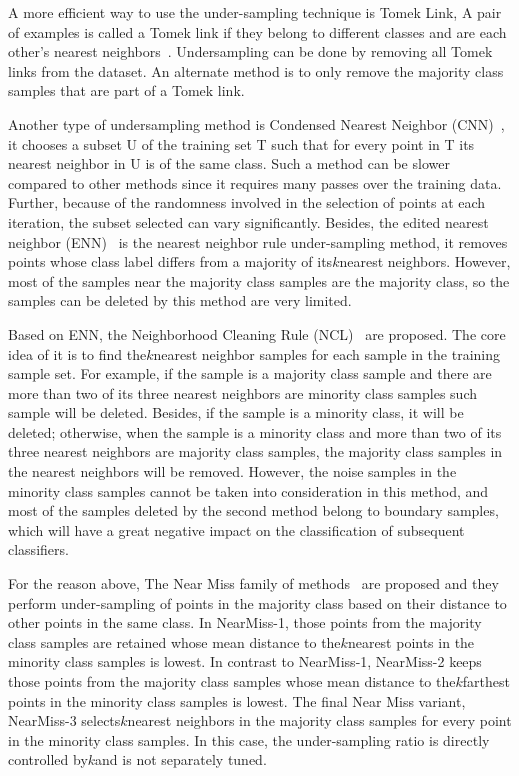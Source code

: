 A more efficient way to use the under-sampling technique is Tomek Link, A pair of examples is called a Tomek link if they belong to diﬀerent classes and are each other’s nearest neighbors~\cite{ref_16}. Undersampling can be done by removing all Tomek links from the dataset. An alternate method is to only remove the majority class samples that are part of a Tomek link.

Another type of undersampling method is Condensed Nearest Neighbor (CNN)~\cite{ref_6}, it chooses a subset U of the training set T such that for every point in T its nearest neighbor in U is of the same class. Such a method can be slower compared to other methods since it requires many passes over the training data. Further, because of the randomness involved in the selection of points at each iteration, the subset selected can vary signiﬁcantly. Besides, the edited nearest neighbor (ENN)~\cite{ref_17} is the nearest neighbor rule under-sampling method, it removes points whose class label differs from a majority of its$k$nearest neighbors. However, most of the samples near the majority class samples are the majority class, so the samples can be deleted by this method are very limited.

Based on ENN, the Neighborhood Cleaning Rule (NCL)~\cite{ref_18} are proposed. The core idea of it is to find the$k$nearest neighbor samples for each sample in the training sample set. For example, if the sample is a majority class sample and there are more than two of its three nearest neighbors are minority class samples such sample will be deleted. Besides, if the sample is a minority class, it will be deleted; otherwise, when the sample is a minority class and more than two of its three nearest neighbors are majority class samples, the majority class samples in the nearest neighbors will be removed. However, the noise samples in the minority class samples cannot be taken into consideration in this method, and most of the samples deleted by the second method belong to boundary samples, which will have a great negative impact on the classification of subsequent classifiers.

For the reason above, The Near Miss family of methods~\cite{ref_19} are proposed and they perform under-sampling of points in the majority class based on their distance to other points in the same class. In NearMiss-1, those points from the majority class samples are retained whose mean distance to the$k$nearest points in the minority class samples is lowest. In contrast to NearMiss-1, NearMiss-2 keeps those points from the majority class samples whose mean distance to the$k$farthest points in the minority class samples is lowest. The ﬁnal Near Miss variant, NearMiss-3 selects$k$nearest neighbors in the majority class samples for every point in the minority class samples. In this case, the under-sampling ratio is directly controlled by$k$and is not separately tuned.

